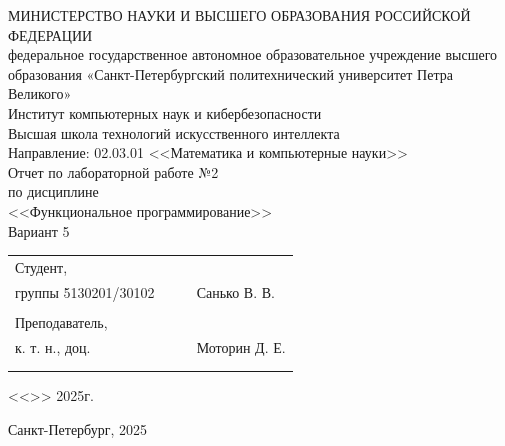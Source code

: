 \documentclass[a4paper, final]{article}
\begin{document}
	
	\begin{center}
		\hfill \break
		\hfill \break
		\normalsize{МИНИСТЕРСТВО НАУКИ И ВЫСШЕГО ОБРАЗОВАНИЯ РОССИЙСКОЙ ФЕДЕРАЦИИ\\
			федеральное государственное автономное образовательное учреждение высшего образования «Санкт-Петербургский политехнический университет Петра Великого»\\[10pt]}
		\normalsize{Институт компьютерных наук и кибербезопасности}\\[10pt] 
		\normalsize{Высшая школа технологий искусственного интеллекта}\\[10pt] 
		\normalsize{Направление: 02.03.01 <<Математика и компьютерные науки>>}\\
		
		\hfill \break
		\hfill \break
		\hfill \break
		\hfill \break
		\large{Отчет по лабораторной работе №2}\\
		\large{по дисциплине}\\
		\large{<<Функциональное программирование>>}\\
		\large{Вариант 5}\\
		\hfill \break
	\end{center}
	
	\small{ 
		\begin{tabular}{lrrl}
			\!\!\!Студент, & \hspace{2cm} & & \\
			\!\!\!группы 5130201/30102 & \hspace{2cm} & \underline{\hspace{3cm}} &Санько В. В. \\\\
			\!\!\!Преподаватель,\\ \hspace{-5pt}к. т. н., доц. & \hspace{2cm} &  \underline{\hspace{3cm}} &  Моторин Д. Е. \\\\
			&&\hspace{4cm}
		\end{tabular}
		\begin{flushright}
			<<\underline{\hspace{1cm}}>>\underline{\hspace{2.5cm}} 2025г.
		\end{flushright}
	}
	
	\hfill \break
	\vspace{3cm}
	\begin{center} \small{Санкт-Петербург, 2025} \end{center}
	\thispagestyle{empty}
	
\end{document}
